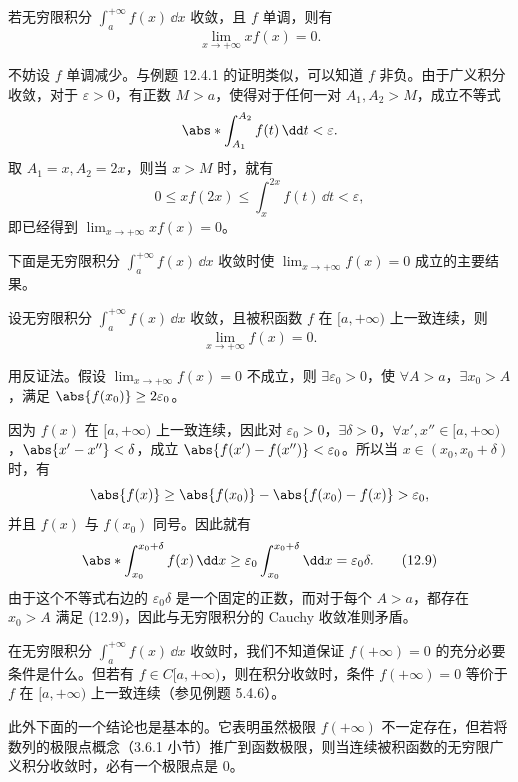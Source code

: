 \begin{xexample}[12.4.2]
若无穷限积分 $\int_a^{+\infty}f(x)\,\dd x$ 收敛，且 $f$ 单调，则有
\[
  \lim_{x\to+\infty}xf(x)=0.
\]
\end{xexample}
\begin{xproof}
不妨设 $f$ 单调减少。与例题 12.4.1 的证明类似，可以知道 $f$ 非负。由于广义积分收敛，对于 $\varepsilon>0$，有正数 $M>a$，使得对于任何一对 $A_1,A_2>M$，成立不等式
\[
  \abs*{\int_{A_1}^{A_2}f(t)\,\dd t}<\varepsilon.
\]
取 $A_1=x,A_2=2x$，则当 $x>M$ 时，就有
\[
  0\leq xf(2x)\leq\int_x^{2x}f(t)\,\dd t<\varepsilon,
\]
即已经得到 $\lim_{x\to+\infty}xf(x)=0$。
\end{xproof}

下面是无穷限积分 $\int_a^{+\infty}f(x)\,\dd x$ 收敛时使 $\lim_{x\to+\infty}f(x)=0$ 成立的主要结果。

\begin{xproposition}[12.4.1]
设无穷限积分 $\int_a^{+\infty}f(x)\,\dd x$ 收敛，且被积函数 $f$ 在 $[a,+\infty)$ 上一致连续，则
\[
  \lim_{x\to+\infty}f(x)=0.
\]
\end{xproposition}
\begin{xproof}
用反证法。假设 $\lim_{x\to+\infty}f(x)=0$ 不成立，则 $\exists\varepsilon_0>0$，使 $\forall A>a$，$\exists x_0>A$，满足 $\abs{f(x_0)}\geq2\varepsilon_0$。

因为 $f(x)$ 在 $[a,+\infty)$ 上一致连续，因此对 $\varepsilon_0>0$，$\exists\delta>0$，$\forall x',x''\in[a,+\infty)$，$\abs{x'-x''}<\delta$，成立 $\abs{f(x')-f(x'')}<\varepsilon_0$。所以当 $x\in(x_0,x_0+\delta)$ 时，有
\[
  \abs{f(x)}\geq\abs{f(x_0)}-\abs{f(x_0)-f(x)}>\varepsilon_0,
\]
并且 $f(x)$ 与 $f(x_0)$ 同号。因此就有
\begin{equation}
  \abs*{\int_{x_0}^{x_0+\delta}f(x)\,\dd x}
  \geq\varepsilon_0\int_{x_0}^{x_0+\delta}\dd x
  =\varepsilon_0\delta.
  \tag{12.9}
  \label{eq:12.9}
\end{equation}
由于这个不等式右边的 $\varepsilon_0\delta$ 是一个固定的正数，而对于每个 $A>a$，都存在 $x_0>A$ 满足 (12.9)，因此与无穷限积分的 Cauchy 收敛准则矛盾。
\end{xproof}

\begin{xremark}
在无穷限积分 $\int_a^{+\infty}f(x)\,\dd x$ 收敛时，我们不知道保证 $f(+\infty)=0$ 的充分必要条件是什么。但若有 $f\in C[a,+\infty)$，则在积分收敛时，条件 $f(+\infty)=0$ 等价于 $f$ 在 $[a,+\infty)$ 上一致连续（参见例题 5.4.6）。

此外下面的一个结论也是基本的。它表明虽然极限 $f(+\infty)$ 不一定存在，但若将数列的极限点概念（3.6.1 小节）推广到函数极限，则当连续被积函数的无穷限广义积分收敛时，必有一个极限点是 0。
\end{xremark}


